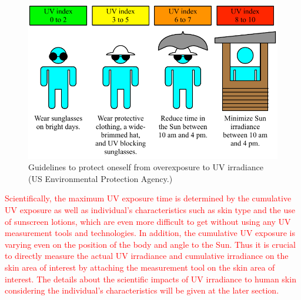 \documentclass[journal]{IEEEtran}
\begin{document}
\begin{figure}
\centering
\includegraphics[width=1.0\hsize]{Figures/UVI_guideline.pdf}
\caption{Guidelines to protect oneself from overexposure to UV irradiance (US Environmental Protection Agency.)}
\label{fig:guidelines}
\vskip -10pt
\end{figure}
\textcolor{red}{Scientifically, the maximum UV exposure time is determined by the cumulative UV exposure as well as individual's characteristics such as skin type and the use of sunscreen lotions, which are even more difficult to get without using any UV measurement tools and technologies. In addition, the cumulative UV exposure is varying even on the position of the body and angle to the Sun. Thus it is crucial to directly measure the actual UV irradiance and cumulative irradiance on the skin area of interest by attaching the measurement tool on the skin area of interest. The details about the scientific impacts of UV irradiance to human skin considering the individual's characteristics will be given at the later section.}
\end{document}
